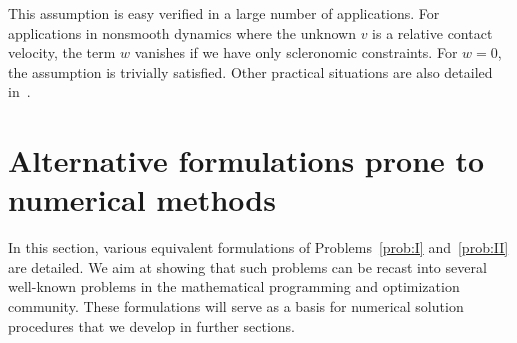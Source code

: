 This assumption is easy verified in a large number of applications. For applications in nonsmooth dynamics where the unknown $v$ is a relative contact velocity, the term $w$ vanishes if we have only scleronomic constraints. For $w=0$, the assumption is trivially satisfied. Other practical situations are also detailed in~\cite{Acary.Cadoux2013}.











\clearpage
\section{Alternative formulations prone to  numerical methods}
\label{sec:formulation}
In this section, various equivalent formulations of Problems~\ref{prob:I} and~\ref{prob:II} are detailed. We aim at showing that such problems can be recast into several well-known problems in the mathematical programming and optimization community. These formulations will serve as a basis for  numerical solution procedures that we develop in further sections.

